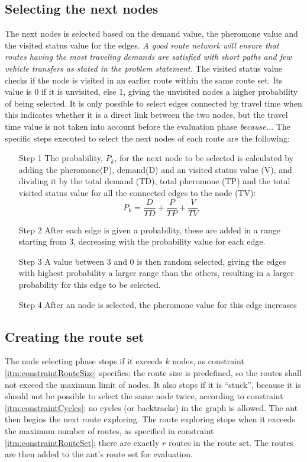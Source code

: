 \subsection{Selecting the next nodes}
The next nodes is selected based on the demand value, the pheromone value and the visited status value for the edges. \emph{\color{red} A good route network will ensure that routes having the most traveling demands are satisfied with short paths and few vehicle transfers as stated in the problem statement.} The visited status value checks if the node is visited in an earlier route within the same route set. Its value is 0 if it is unvisited, else 1, giving the unvisited nodes a higher probability of being selected. It is only possible to select edges connected by travel time when this indicates whether it is a direct link between the two nodes, but the travel time value is not taken into account before the evaluation phase \emph{\color{red} because..}.  %
The specific steps executed to select the next nodes of each route are the following:
\begin{itemize}
\item[Step 1] The probability, $P_k$, for the next node to be selected is calculated by adding the pheromone(P), demand(D) and an visited status value (V), and dividing it by the total demand (TD), total pheromone (TP) and the total visited status value for all the connected edges to the node (TV):
$$ P_{k} = \frac{D}{TD} + \frac{P}{TP} + \frac{V}{TV}$$ 

\item[Step 2] After each edge is given a probability, these are added in a range starting from 3, decreasing with the probability value for each edge. 
\item[Step 3] A value between 3 and 0 is then random selected, giving the edges with highest probability a larger range than the others, resulting in a larger probability for this edge to be selected. 
\item[Step 4] After an node is selected, the pheromone value for this edge increases 
\end{itemize}

\subsection{Creating the route set}
The node selecting phase stops if it exceeds $k$ nodes, as constraint \ref{itm:constraintRouteSize} specifies; the route size is predefined, so the routes shall not exceed the maximum limit of nodes. It also stops if it is ``stuck'', because it is should not be possible to select the same node twice, according to constraint \ref{itm:constraintCycles}; no cycles (or backtracks) in the graph is allowed. The ant then begins the next route exploring. The route exploring stops when it exceeds the maximum number of routes, as specified in constraint \ref{itm:constraintRouteSet}; there are exactly $r$ routes in the route set. The routes are then added to the ant's route set for evaluation.

